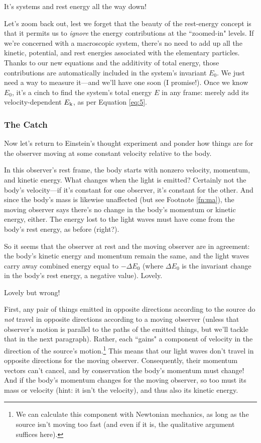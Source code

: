 \documentclass[12pt]{article}
\begin{document}
It's systems and rest energy all the way down!

Let's zoom back out, lest we forget that the beauty of the rest-energy concept is that it permits us to \emph{ignore} the energy contributions at the ``zoomed-in" levels. If we're concerned with a macroscopic system, there's no need to add up all the kinetic, potential, and rest energies associated with the elementary particles. Thanks to our new equations and the additivity of total energy, those contributions are automatically included in the system's invariant $E_0$. We just need a way to measure it---and we'll have one soon (I promise!). Once we know $E_0$, it's a cinch to find the system's total energy $E$ in any frame: merely add its velocity-dependent $E_{\mkern.5mu \textrm{k}}$, as per Equation \ref{eq:5}.

\subsubsection{The Catch}\label{sssec:tc}

Now let's return to Einstein's thought experiment and ponder how things are for the observer moving at some constant velocity relative to the body.

In this observer's rest frame, the body starts with nonzero velocity, momentum, and kinetic energy. What changes when the light is emitted? Certainly not the body's velocity---if it's constant for one observer, it's constant for the other. And since the body's mass is likewise unaffected (but see Footnote \ref{fn:ma}), the moving observer says there's no change in the body's momentum or kinetic energy, either. The energy lost to the light waves must have come from the body's rest energy, as before (right?).

So it seems that the observer at rest and the moving observer are in agreement: the body's kinetic energy and momentum remain the same, and the light waves carry away combined energy equal to $-\Delta E_0$ (where $\Delta E_0$ is the invariant change in the body's rest energy, a negative value). Lovely.

Lovely but wrong!

First, any pair of things emitted in opposite directions according to the source do \emph{not} travel in opposite directions according to a moving observer (unless that observer's motion is parallel to the paths of the emitted things, but we'll tackle that in the next paragraph). Rather, each ``gains" a component of velocity in the direction of the source's motion.\footnote{We can calculate this component with Newtonian mechanics, as long as the source isn't moving too fast (and even if it is, the qualitative argument suffices here).} This means that our light waves don't travel in opposite directions for the moving observer. Consequently, their momentum vectors can't cancel, and by conservation the body's momentum must change! And if the body's momentum changes for the moving observer, so too must its mass or velocity (hint: it isn't the velocity), and thus also its kinetic energy.
\end{document}
